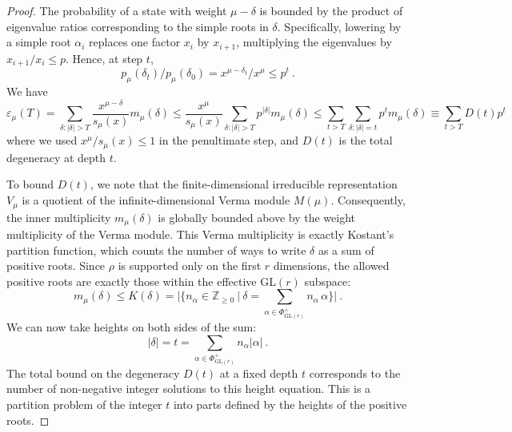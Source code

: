 \documentclass[11pt,letterpaper]{article}
\def\eps{\varepsilon}
\begin{document}
\begin{proof}
The probability of a state with weight $\mu-\delta$ is bounded by the product of eigenvalue ratios corresponding to the simple roots in $\delta$. Specifically, lowering by a simple root $\alpha_i$ replaces one factor $x_i$ by $x_{i+1}$, multiplying the eigenvalues by $x_{i+1}/x_i\leq p$. Hence, at step $t$, 
\begin{equation}
    p_\mu(\delta_t)/p_\mu(\delta_0)=x^{\mu-\delta_t}/x^\mu\leq p^t  \ .  
\end{equation}
We have
\begin{equation}
    \eps_\mu(T) = \sum_{\delta:|\delta|>T}\frac{x^{\mu-\delta}}{s_\mu(x)}m_\mu(\delta)\leq\frac{x^\mu}{s_\mu(x)}\sum_{\delta:|\delta|>T} p^{|\delta|} m_\mu(\delta)\leq\sum_{t> T}\sum_{\delta:|\delta|=t} p^t m_\mu(\delta)\equiv \sum_{t> T} D(t)p^t
\end{equation}
where we used $x^\mu/s_\mu(x)\leq 1$ in the penultimate step, and $D(t)$ is the total degeneracy at depth $t$.

To bound $D(t)$, we note that the finite-dimensional irreducible representation $V_\mu$ is a quotient of the infinite-dimensional Verma module $M(\mu)$. Consequently, the inner multiplicity $m_\mu(\delta)$ is globally bounded above by the weight multiplicity of the Verma module. This Verma multiplicity is exactly Kostant's partition function, which counts the number of ways to write $\delta$ as a sum of positive roots. Since $\rho$ is supported only on the first $r$ dimensions, the allowed positive roots are exactly those within the effective $\mathrm{GL}(r)$ subspace:
\begin{equation}
    m_\mu(\delta) \le K(\delta) = \big| \big\{ n_\alpha \in \mathbb{Z}_{\ge 0} \ \big| \ \delta = \sum_{\alpha\in\Phi^+_{\mathrm{GL}(r)}}n_\alpha\, \alpha \big\} \big| \ .
\end{equation}
We can now take heights on both sides of the sum:
\begin{equation}
|\delta| = t = \sum_{\alpha \in \Phi^+_{\mathrm{GL}(r)}} n_\alpha |\alpha| \ .
\end{equation}
The total bound on the degeneracy $D(t)$ at a fixed depth $t$ corresponds to the number of non-negative integer solutions to this height equation. This is a partition problem of the integer $t$ into parts defined by the heights of the positive roots. 


\end{proof}
\end{document}
